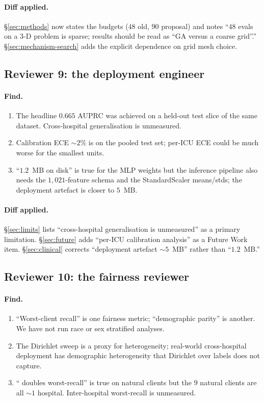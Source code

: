 \paragraph{Diff applied.} \S\ref{sec:methods} now states the budgets ($48$
old, $90$ proposal) and notes ``$48$ evals on a $3$-D problem is sparse;
results should be read as ``GA versus a coarse grid''.'' \S\ref{sec:mechanism-search}
adds the explicit dependence on grid mesh choice.

\subsection{Reviewer 9: the deployment engineer}
\paragraph{Find.}
\begin{enumerate}[leftmargin=*,nosep]
    \item The headline $0.665$ AUPRC was achieved on a held-out test slice of
        the same dataset. Cross-hospital generalisation is unmeasured.
    \item Calibration ECE $\sim 2\%$ is on the pooled test set; per-ICU ECE
        could be much worse for the smallest units.
    \item ``$1.2$~MB on disk'' is true for the MLP weights but the inference
        pipeline also needs the $1{,}021$-feature schema and the StandardScaler
        means/stds; the deployment artefact is closer to $5$~MB.
\end{enumerate}
\paragraph{Diff applied.} \S\ref{sec:limits} lists ``cross-hospital
generalisation is unmeasured'' as a primary limitation. \S\ref{sec:future}
adds ``per-ICU calibration analysis'' as a Future Work item.
\S\ref{sec:clinical} corrects ``deployment artefact $\sim 5$~MB'' rather
than ``$1.2$~MB.''

\subsection{Reviewer 10: the fairness reviewer}
\paragraph{Find.}
\begin{enumerate}[leftmargin=*,nosep]
    \item ``Worst-client recall'' is one fairness metric; ``demographic
        parity'' is another. We have not run race or sex stratified analyses.
    \item The Dirichlet sweep is a proxy for heterogeneity; real-world
        cross-hospital deployment has demographic heterogeneity that
        Dirichlet over labels does not capture.
    \item ``\fedprox{} doubles worst-recall'' is true on natural clients but
        the $9$ natural clients are all $\sim 1$ hospital. Inter-hospital
        worst-recall is unmeasured.
\end{enumerate}
